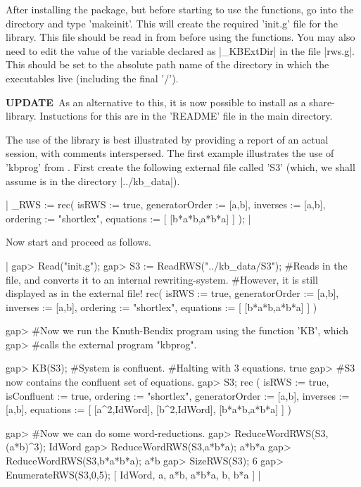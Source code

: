 After installing the package, but before starting to use the {\GAP} functions,
go into the {\GAP} directory and type 'makeinit'. This will create the
required 'init.g' file for the {\GAP} library.
This file should be read in from {\GAP} before using the functions.
You may also need to edit the value of the variable declared as
|_KBExtDir| in the file |rws.g|. This should be set to the absolute path
name of the directory in which the {\KBMAG} executables live (including the
final '/'). 

{\bf UPDATE}\:\ As an alternative to this, it is now possible to install
{\KBMAG} as a share-library. Instuctions for this are in the 'README' file in
the main {\KBMAG} directory.

The use of the library is best illustrated by providing a report of an
actual session, with comments interspersed.
The first example illustrates the use of 'kbprog' from {\GAP}.
First create the following external file called 'S3' (which, we shall assume
is in the directory |../kb_data|).

|
_RWS := rec(
           isRWS := true,
  generatorOrder := [a,b],
        inverses := [a,b],
        ordering := "shortlex",
       equations := [
         [b*a*b,a*b*a]
       ]
);
|

Now start {\GAP} and proceed as follows.

|
gap> Read("init.g");
gap> S3 := ReadRWS("../kb_data/S3");
#Reads in the file, and converts it to an internal rewriting-system.
#However, it is still displayed as in the external file!
rec(
           isRWS := true,
  generatorOrder := [a,b],
        inverses := [a,b],
        ordering := "shortlex",
       equations := [
         [b*a*b,a*b*a]
       ]
)

gap> #Now we run the Knuth-Bendix program using the function 'KB', which
gap> #calls the external program "kbprog".

gap> KB(S3);
#System is confluent.
#Halting with 3 equations.
true
gap> #S3 now contains the confluent set of equations.
gap> S3;
rec (
           isRWS := true,
     isConfluent := true,
        ordering := "shortlex",
  generatorOrder := [a,b],
        inverses := [a,b],
       equations := [
         [a^2,IdWord],
         [b^2,IdWord],
         [b*a*b,a*b*a]
       ]
)

gap> #Now we can do some word-reductions.
gap> ReduceWordRWS(S3,(a*b)^3);
IdWord
gap> ReduceWordRWS(S3,a*b*a);
a*b*a
gap> ReduceWordRWS(S3,b*a*b*a);
a*b
gap> SizeRWS(S3);
6
gap> EnumerateRWS(S3,0,5);
[ IdWord, a, a*b, a*b*a, b, b*a ]
|


